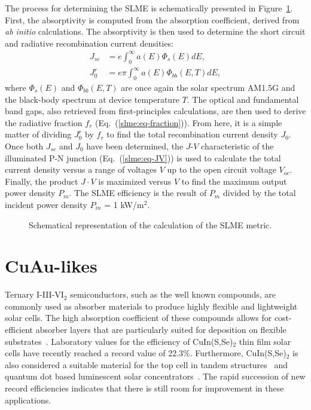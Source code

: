 \begin{refsection}
The process for determining the \gls{SLME} is schematically presented in 
Figure~\ref{slme:fig-SLMEcalc}. First, the absorptivity is computed from the 
absorption coefficient, derived from \textit{ab initio} calculations. 
The absorptivity is then used to determine the short 
circuit and radiative recombination current densities: 
\begin{equation} \label{slme:eq-currents} 
\begin{aligned} 
J_{sc} &= e \int_0^\infty a(E)  \Phi_{s} (E) dE, 
\\ J_0^r &= e\pi \int_0^\infty a(E)  \Phi_{bb} (E,T) dE, 
\end{aligned} 
\end{equation} 
where $\Phi_{s}(E)$ and $\Phi_{bb}(E,T)$ are once again the solar spectrum \gls{AM}1.5G  
and the black-body spectrum at device temperature $T$. The optical 
and fundamental band gaps, also retrieved from first-principles calculations, 
are then used to derive the radiative fraction $f_r$ (Eq.~(\ref{slme:eq-fraction})). From 
here, it is a simple matter of dividing $J_0^r$ by $f_r$ to find the total 
recombination current density $J_0$. Once both $J_{sc}$ and $J_0$ have been determined, the $J$-$V$ characteristic of the illuminated P-N junction 
(Eq.~(\ref{slme:eq-JV})) is used to calculate the total current density versus a range 
of voltages $V$ up to the open circuit voltage $V_{oc}$. Finally,  
the product $J\cdot V$ is maximized versus $V$ to find the maximum output power density 
$P_m$. The \gls{SLME} efficiency is the result of $P_m$ divided by the total 
incident power density $P_{in}$ = 1 kW/m$^2$. 
 
 
\begin{figure}[ht]  
\centering 

\caption{Schematical representation of the calculation of the \gls{SLME} metric.} 
\label{slme:fig-SLMEcalc} 
\end{figure} 
 
\section{CuAu-likes} \label{slme:sec-CuAu} 
 
Ternary I-III-VI$_2$ semiconductors, such as the well known 
 compounds, are commonly used as absorber materials to 
produce highly flexible and lightweight solar cells. The high absorption 
coefficient of these compounds allows for cost-efficient absorber layers that 
are particularly suited for deposition on flexible 
substrates~\cite{Reinhard2013}. Laboratory values for the efficiency of 
CuIn(S,Se)$_2$ thin film solar cells have recently reached a record value of 
22.3\%. Furthermore, CuIn(S,Se)$_2$ is also considered a suitable material for 
the top cell in tandem structures~\cite{Cheek2013} and quantum dot based 
luminescent solar concentrators~\cite{Hu2015}. The rapid succession of new 
record efficiencies indicates that there is still room for improvement in 
these applications. 
 

\end{refsection}
